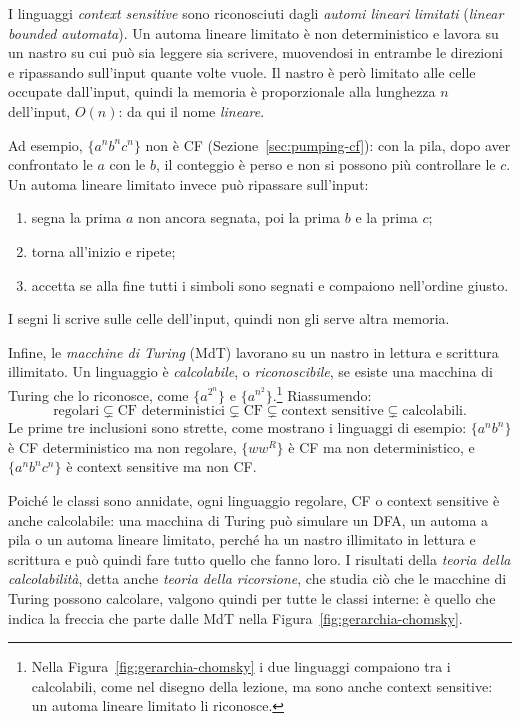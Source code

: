 \documentclass[a4paper, 11pt, oneside]{book}
\theoremstyle{formale}
\begin{document}
    I linguaggi \emph{context sensitive} sono riconosciuti dagli \emph{automi lineari
    limitati} (\emph{linear bounded automata}). Un automa lineare limitato \`e non
    deterministico e lavora su un nastro su cui pu\`o sia leggere sia scrivere,
    muovendosi in entrambe le direzioni e ripassando sull'input quante volte vuole. Il
    nastro \`e per\`o limitato alle celle occupate dall'input, quindi la memoria \`e
    proporzionale alla lunghezza $n$ dell'input, $O(n)$: da qui il nome \emph{lineare}.

    Ad esempio, $\{a^n b^n c^n\}$ non \`e CF (Sezione~\ref{sec:pumping-cf}): con la
    pila, dopo aver confrontato le $a$ con le $b$, il conteggio \`e perso e non si
    possono pi\`u controllare le $c$. Un automa lineare limitato invece pu\`o ripassare
    sull'input:
    \begin{enumerate}
        \item segna la prima $a$ non ancora segnata, poi la prima $b$ e la prima $c$;
        \item torna all'inizio e ripete;
        \item accetta se alla fine tutti i simboli sono segnati e compaiono nell'ordine
            giusto.
    \end{enumerate}
    I segni li scrive sulle celle dell'input, quindi non gli serve altra memoria.

    Infine, le \emph{macchine di Turing} (MdT) lavorano su un nastro in lettura e
    scrittura illimitato. Un linguaggio \`e \emph{calcolabile}, o \emph{riconoscibile},
    se esiste una macchina di Turing che lo riconosce, come $\{a^{2^n}\}$ e
    $\{a^{n^2}\}$.\footnote{Nella Figura~\ref{fig:gerarchia-chomsky} i due linguaggi
    compaiono tra i calcolabili, come nel disegno della lezione, ma sono anche context
    sensitive: un automa lineare limitato li riconosce.} Riassumendo:
    \begin{equation*}
        \text{regolari} \subsetneq \text{CF deterministici} \subsetneq \text{CF}
        \subsetneq \text{context sensitive} \subsetneq \text{calcolabili}.
    \end{equation*}
    Le prime tre inclusioni sono strette, come mostrano i linguaggi di esempio:
    $\{a^n b^n\}$ \`e CF deterministico ma non regolare, $\{w w^R\}$ \`e CF ma non
    deterministico, e $\{a^n b^n c^n\}$ \`e context sensitive ma non CF.

    Poich\'e le classi sono annidate, ogni linguaggio regolare, CF o context sensitive
    \`e anche calcolabile: una macchina di Turing pu\`o simulare un DFA, un automa a pila
    o un automa lineare limitato, perch\'e ha un nastro illimitato in lettura e
    scrittura e pu\`o quindi fare tutto quello che fanno loro. I risultati della
    \emph{teoria della calcolabilit\`a}, detta anche \emph{teoria della ricorsione}, che
    studia ci\`o che le macchine di Turing possono calcolare, valgono quindi per tutte le
    classi interne: \`e quello che indica la freccia che parte dalle MdT nella
    Figura~\ref{fig:gerarchia-chomsky}.
    \endgroup
    \addtocounter{chapter}{-1}
\end{document}
